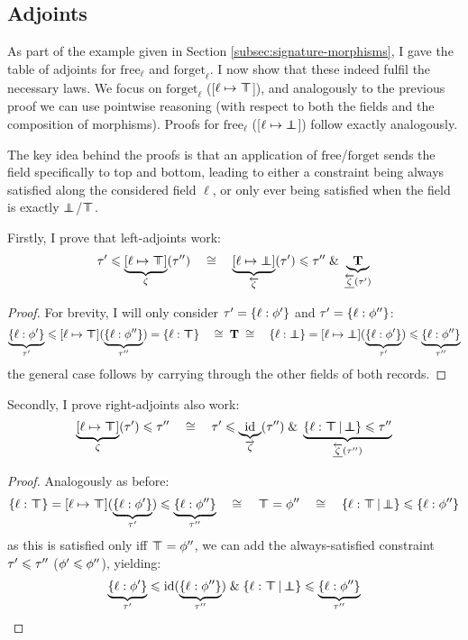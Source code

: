 \needspace{6em}
\subsection{Adjoints}

As part of the example given in Section \ref{subsec:signature-morphisms}, I gave the table of adjoints for $\mathrm{free}_\ell$ and $\mathrm{forget}_\ell$. I now show that these indeed fulfil the necessary laws. We focus on $\mathrm{forget}_\ell$ ([$\ell \mapsto \top \!\!\!\! \top$]), and analogously to the previous proof we can use pointwise reasoning (with respect to both the fields and the composition of morphisms). Proofs for $\mathrm{free}_\ell$ ([$\ell \mapsto \bot \!\!\!\! \bot$]) follow exactly analogously.

The key idea behind the proofs is that an application of $\mathrm{free}$/$\mathrm{forget}$ sends the field specifically to top and bottom, leading to either a constraint being always satisfied along the considered field $\ell$, or only ever being satisfied when the field is exactly $\bot \!\!\!\! \bot$/$\top \!\!\!\! \top$.

Firstly, I prove that left-adjoints work:
$$ \tau' \sub \underbrace{[\ell \mapsto \flftop]}_\morph(\tau'') \quad\cstreq\quad \underbrace{[\ell \mapsto \flfbot]}_{\ladj \morph}(\tau') \sub \tau'' \und \underbrace{\tru}_{\ladjrest \morph(\tau')} $$
\begin{proof}
For brevity, I will only consider $\tau' = \flrec{\ell : \phi'}$ and $\tau' = \flrec{\ell : \phi''}$:
$$ \underbrace{\flrec{\ell : \phi'}}_{\tau'} \sub [\ell \mapsto \flftop] \left( \smash{\underbrace{\flrec{\ell : \phi''}}_{\tau''}} \right) = \flrec{\ell : \flftop} \quad\cstreq\; \tru \;\cstreq\quad \flrec{\ell : \flfbot} = [\ell \mapsto \flfbot] \left( \smash{\underbrace{\flrec{\ell : \phi'}}_{\tau'}} \right) \sub \underbrace{\flrec{\ell : \phi''}}_{\tau''} $$
the general case follows by carrying through the other fields of both records.
\end{proof}

Secondly, I prove right-adjoints also work:
$$ \underbrace{[\ell \mapsto \flftop]}_\morph(\tau') \sub \tau'' \quad\cstreq\quad  \tau' \sub \underbrace{\id}_{\radj \morph}(\tau'') \und \underbrace{\flext{\ell : \flftop}{\flfbot} \sub \tau''}_{\ladjrest \morph(\tau'')} $$
\begin{proof}
Analogously as before:
$$ \flrec{\ell : \flftop} =  [\ell \mapsto \flftop] \left( \smash{\underbrace{\flrec{\ell : \phi'}}_{\tau'}} \right) \sub \underbrace{\flrec{\ell : \phi''}}_{\tau''} \quad\cstreq\quad \flftop = \phi'' \quad\cstreq\quad \flext{\ell : \flftop}{\flfbot} \sub \flrec{\ell : \phi''}  $$
as this is satisfied only iff $\top \!\!\!\! \top = \phi''$, we can add the always-satisfied constraint $\tau' \leqslant \tau''$ ($\phi' \leqslant \phi''$), yielding:
$$ \underbrace{\flrec{\ell : \phi'}}_{\tau'} \sub \mathrm{id} \left( \smash{\underbrace{\flrec{\ell : \phi''}}_{\tau''}} \right) \und \flext{\ell : \flftop}{\flfbot} \sub \underbrace{\flrec{\ell : \phi''}}_{\tau''} $$
\end{proof}

